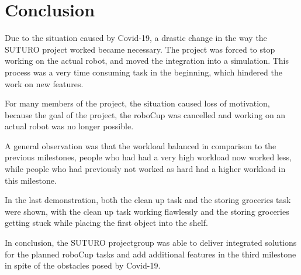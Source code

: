 \documentclass[main.tex]{subfiles}
\begin{document}
	
	\chapter{Conclusion}
	Due to the situation caused by Covid-19, a drastic change in the way the SUTURO project worked became necessary.  The project was forced to stop working on the actual robot, and moved the integration into a simulation. This process was a very time consuming task in the beginning, which hindered the work on new features.
	
	For many members of the project, the situation caused loss of motivation, because the goal of the project, the roboCup was cancelled and working on an actual robot was no longer possible. 
	
	A general observation was that the workload balanced in comparison to the previous milestones, people who had had a very high workload now worked less, while people who had previously not worked as hard had a higher workload in this milestone.
	
	In the last demonstration, both the clean up task and the storing groceries task were shown, with the clean up task working flawlessly and the storing groceries getting stuck while placing the first object into the shelf.
	
	In conclusion, the SUTURO projectgroup was able to deliver integrated solutions for the planned roboCup tasks and add additional features in the third milestone in spite of the obstacles posed by Covid-19. 


	
\end{document}
